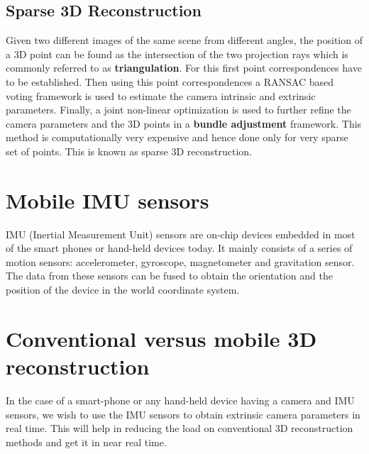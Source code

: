 \documentclass{article}
\begin{document}
			\subsection{Sparse 3D Reconstruction} 
				Given two different images of the same scene from different angles, the position of a 3D point can be found as the intersection of the two projection rays which is commonly referred to as \textbf{triangulation}. For this first point correspondences have to be established. Then using this point correspondences a RANSAC based voting framework is used to estimate the camera intrinsic and extrinsic parameters. Finally, a joint non-linear optimization is used to further refine the camera parameters and the 3D points in a \textbf{bundle adjustment} framework. This method is computationally very expensive and hence done only for very sparse set of points. This is known as sparse 3D reconstruction.

			\section{Mobile IMU sensors}
				IMU (Inertial Measurement Unit) sensors are on-chip devices embedded in most of the smart phones or hand-held devices today. It mainly consists of a series of motion sensors: accelerometer, gyroscope, magnetometer and gravitation sensor. The data from these sensors can be fused to obtain the orientation and the position of the device in the world coordinate system.

			\section{Conventional versus mobile 3D reconstruction}
				In the case of a smart-phone or any hand-held device having a camera and IMU sensors, we wish to use  the IMU sensors to obtain extrinsic camera parameters in real time. This will help in reducing the load on conventional 3D reconstruction methods and get it in near real time.
\end{document}
